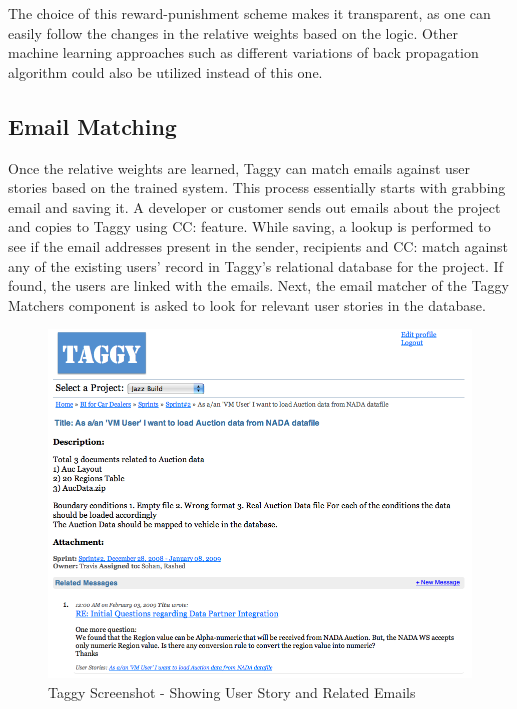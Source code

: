 The choice of this reward-punishment scheme makes it transparent, as one can easily follow the changes in the relative weights based on the logic. Other machine learning approaches such as different variations of back propagation algorithm could also be utilized instead of this one.

\subsection{Email Matching}
Once the relative weights are learned, Taggy can match emails against user stories based on the trained system. This process essentially starts with grabbing email and saving it. A developer or customer sends out emails about the project and copies to Taggy using CC: feature. While saving, a lookup is performed to see if the email addresses present in the sender, recipients and CC: match against any of the existing users' record in Taggy's relational database for the project. If found, the users are linked with the emails. Next, the email matcher of the Taggy Matchers component is asked to look for relevant user stories in the database.

\begin{figure}[tb]
	\centering
	\includegraphics[width=\textwidth]{taggy_user_story.png}
    \caption{Taggy Screenshot - Showing User Story and Related Emails}
	\label{fig:taggy_user_story}
\end{figure}

